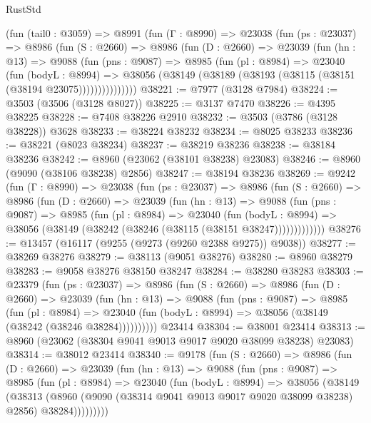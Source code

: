 \begin{lexlean}{RustStd}
\begin{coremodule}
    (fun (tail0 : @3059) =>
    @8991
      (fun (Γ : @8990) =>
      @23038
        (fun (ps : @23037) =>
        @8986
          (fun (S : @2660) =>
          @8986
            (fun (D : @2660) =>
            @23039
              (fun (hn : @13) =>
              @9088
                (fun (pns : @9087) =>
                @8985
                  (fun (pl : @8984) =>
                  @23040
                    (fun (bodyL : @8994) =>
                    @38056 (@38149 (@38189 (@38193 (@38115 (@38151 (@38194 @23075)))))))))))))))
@38221 := @7977 (@3128 @7984)
@38224 := @3503 (@3506 (@3128 @8027))
@38225 := @3137 @7470
@38226 := @4395 @38225
@38228 := @7408 @38226 @2910
@38232 := @3503 (@3786 (@3128 @38228)) @3628
@38233 := @38224 @38232
@38234 := @8025 @38233
@38236 := @38221 (@8023 @38234)
@38237 := @38219 @38236
@38238 := @38184 @38236
@38242 := @8960 (@23062 (@38101 @38238) @23083)
@38246 := @8960 (@9090 (@38106 @38238) @2856)
@38247 := @38194 @38236
@38269 := @9242
    (fun (Γ : @8990) =>
    @23038
      (fun (ps : @23037) =>
      @8986
        (fun (S : @2660) =>
        @8986
          (fun (D : @2660) =>
          @23039
            (fun (hn : @13) =>
            @9088
              (fun (pns : @9087) =>
              @8985
                (fun (pl : @8984) =>
                @23040
                  (fun (bodyL : @8994) =>
                  @38056 (@38149 (@38242 (@38246 (@38115 (@38151 @38247)))))))))))))
@38276 := @13457 (@16117 (@9255 (@9273 (@9260 @2388 @9275)) @9038))
@38277 := @38269 @38276
@38279 := @38113 (@9051 @38276)
@38280 := @8960 @38279
@38283 := @9058 @38276 @38150 @38247
@38284 := @38280 @38283
@38303 := @23379
    (fun (ps : @23037) =>
    @8986
      (fun (S : @2660) =>
      @8986
        (fun (D : @2660) =>
        @23039
          (fun (hn : @13) =>
          @9088
            (fun (pns : @9087) =>
            @8985
              (fun (pl : @8984) =>
              @23040 (fun (bodyL : @8994) => @38056 (@38149 (@38242 (@38246 @38284))))))))))
    @23414
@38304 := @38001 @23414
@38313 := @8960 (@23062 (@38304 @9041 @9013 @9017 @9020 @38099 @38238) @23083)
@38314 := @38012 @23414
@38340 := @9178
    (fun (S : @2660) =>
    @8986
      (fun (D : @2660) =>
      @23039
        (fun (hn : @13) =>
        @9088
          (fun (pns : @9087) =>
          @8985
            (fun (pl : @8984) =>
            @23040
              (fun (bodyL : @8994) =>
              @38056
                (@38149
                  (@38313
                    (@8960
                      (@9090 (@38314 @9041 @9013 @9017 @9020 @38099 @38238) @2856)
                      @38284)))))))))

\end{coremodule}
\end{lexlean}
